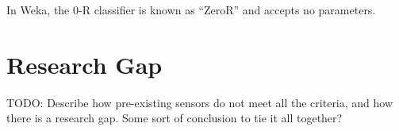 \documentclass[../thesis/thesis.tex]{subfiles}
\begin{document}
In Weka, the 0-R classifier is known as ``ZeroR'' and accepts no parameters.

\section{Research Gap}
TODO: Describe how pre-existing sensors do not meet all the criteria, and how there is a research gap. Some sort of conclusion to tie it all together?

\end{document}
